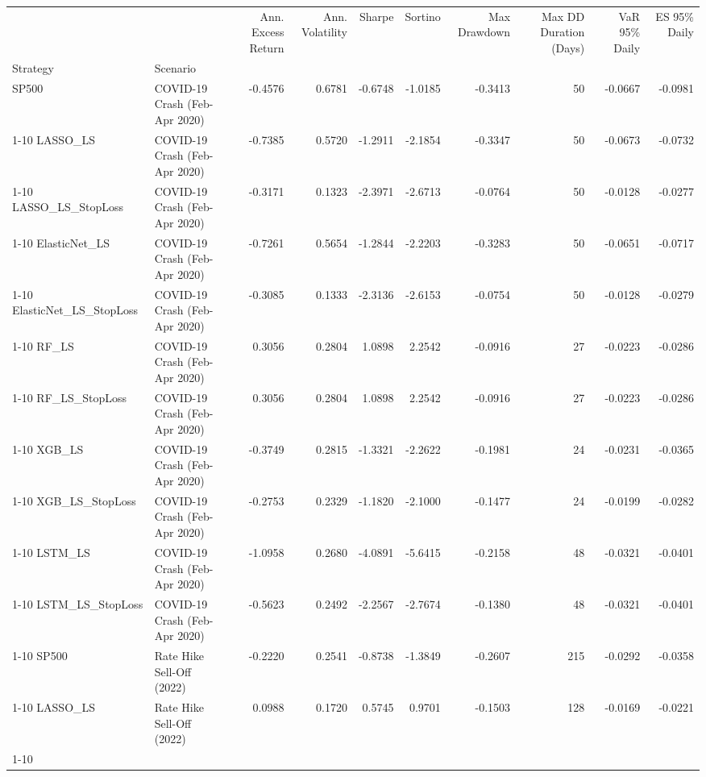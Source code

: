 \begin{tabular}{llrrrrrrrr}
\toprule
 &  & Ann. Excess Return & Ann. Volatility & Sharpe & Sortino & Max Drawdown & Max DD Duration (Days) & VaR 95\% Daily & ES 95\% Daily \\
Strategy & Scenario &  &  &  &  &  &  &  &  \\
\midrule
SP500 & COVID-19 Crash (Feb-Apr 2020) & -0.4576 & 0.6781 & -0.6748 & -1.0185 & -0.3413 & 50 & -0.0667 & -0.0981 \\
\cline{1-10}
LASSO\_LS & COVID-19 Crash (Feb-Apr 2020) & -0.7385 & 0.5720 & -1.2911 & -2.1854 & -0.3347 & 50 & -0.0673 & -0.0732 \\
\cline{1-10}
LASSO\_LS\_StopLoss & COVID-19 Crash (Feb-Apr 2020) & -0.3171 & 0.1323 & -2.3971 & -2.6713 & -0.0764 & 50 & -0.0128 & -0.0277 \\
\cline{1-10}
ElasticNet\_LS & COVID-19 Crash (Feb-Apr 2020) & -0.7261 & 0.5654 & -1.2844 & -2.2203 & -0.3283 & 50 & -0.0651 & -0.0717 \\
\cline{1-10}
ElasticNet\_LS\_StopLoss & COVID-19 Crash (Feb-Apr 2020) & -0.3085 & 0.1333 & -2.3136 & -2.6153 & -0.0754 & 50 & -0.0128 & -0.0279 \\
\cline{1-10}
RF\_LS & COVID-19 Crash (Feb-Apr 2020) & 0.3056 & 0.2804 & 1.0898 & 2.2542 & -0.0916 & 27 & -0.0223 & -0.0286 \\
\cline{1-10}
RF\_LS\_StopLoss & COVID-19 Crash (Feb-Apr 2020) & 0.3056 & 0.2804 & 1.0898 & 2.2542 & -0.0916 & 27 & -0.0223 & -0.0286 \\
\cline{1-10}
XGB\_LS & COVID-19 Crash (Feb-Apr 2020) & -0.3749 & 0.2815 & -1.3321 & -2.2622 & -0.1981 & 24 & -0.0231 & -0.0365 \\
\cline{1-10}
XGB\_LS\_StopLoss & COVID-19 Crash (Feb-Apr 2020) & -0.2753 & 0.2329 & -1.1820 & -2.1000 & -0.1477 & 24 & -0.0199 & -0.0282 \\
\cline{1-10}
LSTM\_LS & COVID-19 Crash (Feb-Apr 2020) & -1.0958 & 0.2680 & -4.0891 & -5.6415 & -0.2158 & 48 & -0.0321 & -0.0401 \\
\cline{1-10}
LSTM\_LS\_StopLoss & COVID-19 Crash (Feb-Apr 2020) & -0.5623 & 0.2492 & -2.2567 & -2.7674 & -0.1380 & 48 & -0.0321 & -0.0401 \\
\cline{1-10}
SP500 & Rate Hike Sell-Off (2022) & -0.2220 & 0.2541 & -0.8738 & -1.3849 & -0.2607 & 215 & -0.0292 & -0.0358 \\
\cline{1-10}
LASSO\_LS & Rate Hike Sell-Off (2022) & 0.0988 & 0.1720 & 0.5745 & 0.9701 & -0.1503 & 128 & -0.0169 & -0.0221 \\
\cline{1-10}

\end{tabular}

